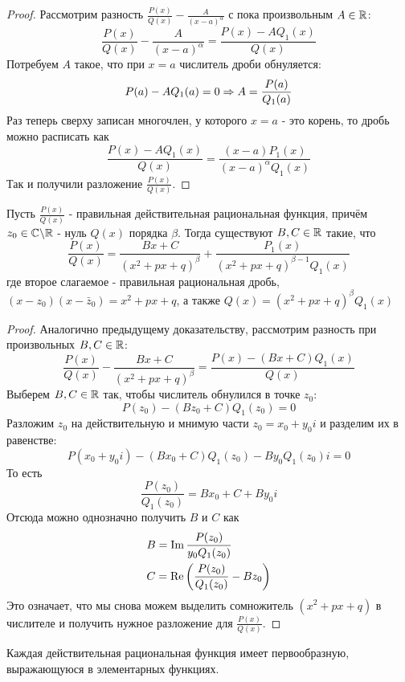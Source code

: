 \begin{proof}
	Рассмотрим разность \(\frac{P(x)}{Q(x)} - \frac{A}{(x - a)^\alpha}\) с пока произвольным $A \in \mathbb{R}$:
	\[
		\frac{P(x)}{Q(x)} - \frac{A}{(x - a)^\alpha} = \frac{P(x) - AQ_1(x)}{Q(x)}
	\]
	Потребуем $A$ такое, что при $x = a$ числитель дроби обнуляется:
	\[
		P(a) - AQ_1(a) = 0 \Rightarrow A = \frac{P(a)}{Q_1(a)}
	\]
	Раз теперь сверху записан многочлен, у которого $x = a$ - это корень, то дробь можно расписать как
	\[
		\frac{P(x) - AQ_1(x)}{Q(x)} = \frac{(x - a)P_1(x)}{(x - a)^\alpha Q_1(x)}
	\]
	Так и получили разложение $\frac{P(x)}{Q(x)}$.
\end{proof}

\begin{lemma}
	Пусть $\frac{P(x)}{Q(x)}$ - правильная действительная рациональная функция, причём $z_0 \in \mathbb{C} \backslash \mathbb{R}$ - нуль $Q(x)$ порядка $\beta$. Тогда существуют $B, C \in \mathbb{R}$ такие, что
	\[
		\frac{P(x)}{Q(x)} = \frac{Bx + C}{(x^2 + px + q)^\beta} + \frac{P_1(x)}{(x^2 + px + q)^{\beta - 1} Q_1(x)}
	\]
	где второе слагаемое - правильная рациональная дробь, $(x - z_0)(x - \bar{z}_0) = x^2 + px + q$, а также $Q(x) = (x^2 + px + q)^\beta Q_1(x)$
\end{lemma}

\begin{proof}
	Аналогично предыдущему доказательству, рассмотрим разность при произвольных $B, C \in \mathbb{R}$:
	\[
		\frac{P(x)}{Q(x)} - \frac{Bx + C}{(x^2 + px + q)^\beta} = \frac{P(x) - (Bx + C)Q_1(x)}{Q(x)}
	\]
	Выберем $B, C \in \mathbb{R}$ так, чтобы числитель обнулился в точке $z_0$:
	\[
		P(z_0) - (Bz_0 + C)Q_1(z_0) = 0
	\]
	Разложим $z_0$ на действительную и мнимую части $z_0 = x_0 + y_0 i$ и разделим их в равенстве:
	\[
		P(x_0 + y_0 i) - (Bx_0 + C)Q_1(z_0) - By_0 Q_1(z_0) i = 0
	\]
	То есть
	\[
		\frac{P(z_0)}{Q_1(z_0)} = Bx_0 + C + By_0 i
	\]
	Отсюда можно однозначно получить $B$ и $C$ как
	\begin{align*}
		&{B = \operatorname{Im} \frac{P(z_0)}{y_0 Q_1(z_0)}}
		\\
		&{C = \operatorname{Re} \left(\frac{P(z_0)}{Q_1(z_0)} - Bz_0\right)}
	\end{align*}
	Это означает, что мы снова можем выделить сомножитель $(x^2 + px + q)$ в числителе и получить нужное разложение для $\frac{P(x)}{Q(x)}$.
\end{proof}

\begin{theorem}
	Каждая действительная рациональная функция имеет первообразную, выражающуюся в элементарных функциях.
\end{theorem}


